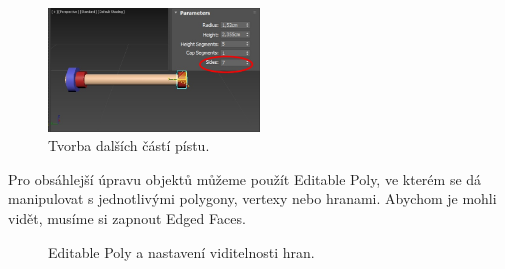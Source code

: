 \documentclass[12pt, a4paper,
twoside,        %
openright
]{report}
\begin{document}
\begin{figure}[h!]
	\centering 
	\includegraphics[width=0.5\textwidth]{image/modelovani2.jpg} 
	\caption{Tvorba dalších částí pístu.} 
	\label{fig:modelovani_cast2} 
\end{figure}


Pro obsáhlejší úpravu objektů můžeme použít Editable Poly, ve kterém se dá manipulovat s jednotlivými polygony, vertexy nebo hranami. Abychom je mohli vidět, musíme si zapnout Edged Faces.  

\begin{figure}[h!]
	\centering
	\qquad
	\caption{Editable Poly a nastavení viditelnosti hran.}
	\label{fig:modelovani_cast3}
\end{figure}
\end{document}
